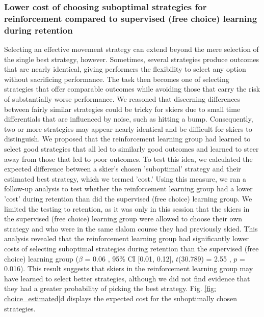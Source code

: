 \documentclass[pdflatex,sn-nature]{sn-jnl}%
\theoremstyle{thmstyleone}%
\theoremstyle{thmstyletwo}%
\theoremstyle{thmstylethree}%
\begin{document}
\subsubsection{Lower cost of choosing suboptimal strategies for reinforcement compared to supervised (free choice) learning during retention}\label{result_strategychoice_regret}
Selecting an effective movement strategy can extend beyond the mere selection of the single best strategy, however. Sometimes, several strategies produce outcomes that are nearly identical, giving performers the flexibility to select any option without sacrificing performance. The task then becomes one of selecting strategies that offer comparable outcomes while avoiding those that carry the risk of substantially worse performance. We reasoned that discerning differences between fairly similar strategies could be tricky for skiers due to small time differentials that are influenced by noise, such as hitting a bump. Consequently, two or more strategies may appear nearly identical and be difficult for skiers to distinguish. We proposed that the reinforcement learning group had learned to select good strategies that all led to similarly good outcomes and learned to steer away from those that led to poor outcomes. To test this idea, we calculated the expected difference between a skier's chosen 'suboptimal' strategy and their estimated best strategy, which we termed 'cost.' Using this measure, we ran a follow-up analysis to test whether the reinforcement learning group had a lower 'cost' during retention than did the supervised (free choice) learning group. We limited the testing to retention, as it was only in this session that the skiers in the supervised (free choice) learning group were allowed to choose their own strategy and who were in the same slalom course they had previously skied. This analysis revealed that the reinforcement learning group had significantly lower costs of selecting suboptimal strategies during retention than the supervised (free choice) learning group ($\beta$ = 0.06 , 95\% CI [0.01, 0.12], $t$(30.789) = 2.55 , $p$ = 0.016). This result suggests that skiers in the reinforcement learning group may have learned to select better strategies, although we did not find evidence that they had a greater probability of picking the best strategy. Fig. \ref{fig: choice_estimated}d displays the expected cost for the suboptimally chosen strategies.
\end{document}
